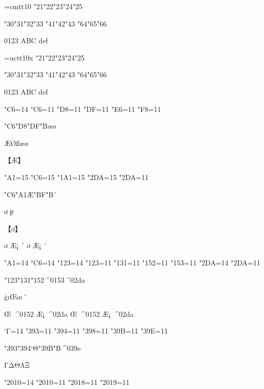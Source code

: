 %
\ifx\fmtname\undefined
  
  \def\fmtname{basic}
  \expandafter\dump
\fi
\begingroup %
\font\cmtt=cmtt10
\cmtt
\char"21\char"22\char"23\char"24\char"25

\char"30\char"31\char"32\char"33 \char"41\char"42\char"43 \char"64\char"65\char"66

0123 ABC def


\font\uctt=uctt10x
\uctt
\char"21\char"22\char"23\char"24\char"25

\char"30\char"31\char"32\char"33 \char"41\char"42\char"43 \char"64\char"65\char"66

0123 ABC def


\kcatcode"C6=14 %
\catcode"C6=11  \catcode"D8=11  \catcode"DF=11
\catcode"E6=11  \catcode"F8=11

\char"C6\Uchar"D8\Ucharcat"DF"B^^e6^^f8

ÆØßæø

\hbox{【Æ】}

\kcatcode"A1=15 %
\kcatcode"C6=15
\kcatcode"1A1=15
\kcatcode"2DA=15
\catcode"2DA=11

\char"C6\Uchar"A1^^c6\Ucharcat"BF"B^^b4

ơ%
ƿ%

\hbox{【ơ】}

\def\AAA{ơ ^^c6^^a1 ^^b4}\AAA
\edef\mAAA{\meaning\AAA}\mAAA

\kcatcode"A1=14
\kcatcode"C6=14
\kcatcode"123=14
\catcode"123=11  \catcode"131=11
\catcode"152=11  \catcode"153=11
\kcatcode"2DA=14
\catcode"2DA=11

\char"123\char"131\Uchar"152^^^^0153^^^^02da

ģıŒœ˚

\def\AAA{Œ ^^^^0152 ^^c6^^a1 ^^^^02da}\AAA
\edef\mAAA{\meaning\AAA}\mAAA

\kcatcode`Γ=14 %
\catcode"393=11  \catcode"394=11  \catcode"398=11
\catcode"39B=11  \catcode"39E=11

\char"393\Uchar"394\char`Θ\Ucharcat"39B"B^^^^039e

ΓΔΘΛΞ

\kcatcode"2010=14
\catcode"2010=11  \catcode"2018=11  \catcode"2019=11


